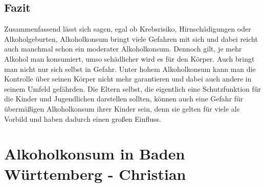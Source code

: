 \documentclass[12pt]{article}
\begin{document}
\subsection{Fazit}
Zusammenfassend lässt sich sagen, egal ob Krebsrisiko, Hirnschädigungen oder Alkoholgeburten, Alkoholkonsum bringt viele Gefahren mit sich und dabei reicht auch manchmal schon ein moderater Alkoholkonsum. Dennoch gilt, je mehr Alkohol man konsumiert, umso schädlicher wird es für den Körper. Auch bringt man nicht nur sich selbst in Gefahr. Unter hohem Alkoholkonsum kann man die Kontrolle über seinen Körper nicht mehr garantieren und dabei auch andere in seinem Umfeld gefährden. Die Eltern selbst, die eigentlich eine Schutzfunktion für die Kinder und Jugendlichen darstellen sollten, können auch eine Gefahr für übermäßigen Alkoholkonsum ihrer Kinder sein, denn sie gelten für viele als Vorbild und haben dadurch einen großen Einfluss. 


\section{Alkoholkonsum in Baden Württemberg \footnotesize{- Christian}}
\end{document}
